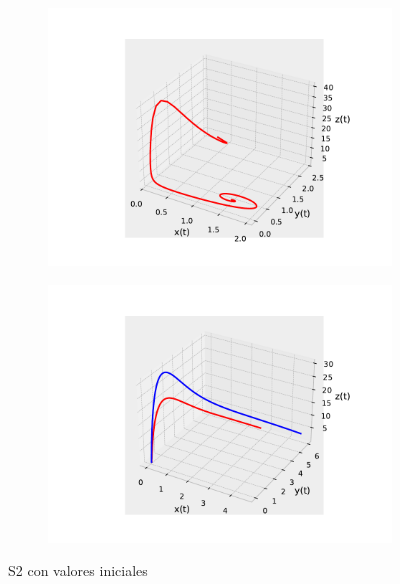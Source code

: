 \documentclass{wscpaperproc}
\theoremstyle{wsc}
\begin{document}
\begin{figure}[h]
	\centering
	\begin{subfigure}[b]{0.5\textwidth}
		\centering
		\includegraphics[width=\textwidth]{Simulations/S33d.pdf}
	
		\label{fig:comparativa91}
	\end{subfigure}%
	\begin{subfigure}[b]{0.5\textwidth}
		\centering
		\includegraphics[width=\textwidth]{Simulations/S13d.pdf}
		\label{fig:comparativa92}
	\end{subfigure}
	\caption{S2 con valores iniciales}

	\label{fig:comparacion10}
\end{figure}
\end{document}
